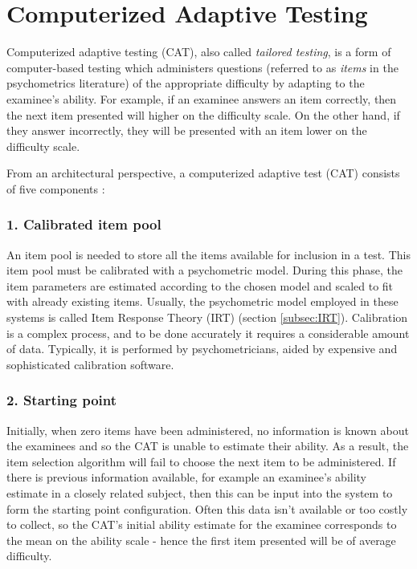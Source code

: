 \section{Computerized Adaptive Testing}
\label{sec:CAT}
Computerized adaptive testing (CAT), also called \textit{tailored testing}, is a form of computer-based testing which administers questions (referred to as \textit{items} in the psychometrics literature) of the appropriate difficulty by adapting to the examinee's ability.
For example, if an examinee answers an item correctly, then the next item presented will higher on the difficulty scale. On the other hand, if they answer incorrectly, they will be presented with an item lower on the difficulty scale. \newline

From an architectural perspective, a computerized adaptive test (CAT) consists of five components \cite{CAT-Framework}:

\subsubsection{1. Calibrated item pool}
An item pool is needed to store all the items available for inclusion in a test. This item pool must be calibrated with a psychometric model. During this phase, the item parameters are estimated according to the chosen model and scaled to fit with already existing items. Usually, the psychometric model employed in these systems is called Item Response Theory (IRT) (section \ref{subsec:IRT}). Calibration is a complex process, and to be done accurately it requires a considerable amount of data. Typically, it is performed by psychometricians, aided by expensive and sophisticated calibration software.

\subsubsection{2. Starting point}
Initially, when zero items have been administered, no information is known about the examinees and so the CAT is unable to estimate their ability. As a result, the item selection algorithm will fail to choose the next item to be administered.
If there is previous information available, for example an examinee's ability estimate in a closely related subject, then this can be input into the system to form the starting point configuration. Often this data isn't available or too costly to collect, so the CAT's initial ability estimate for the examinee corresponds to the mean on the ability scale - hence the first item presented will be of average difficulty.

